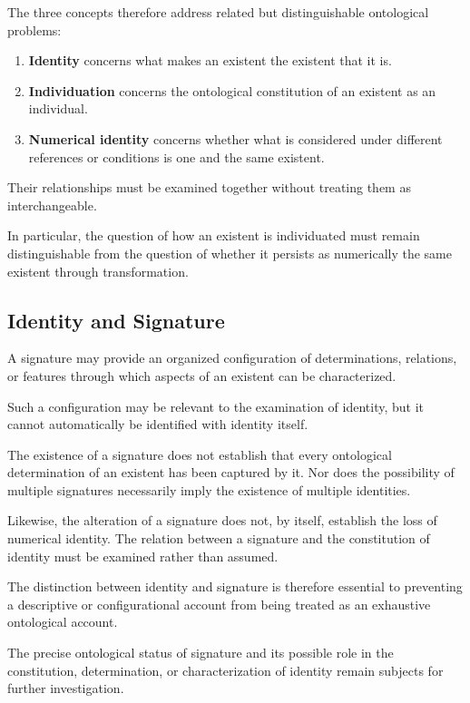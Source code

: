 The three concepts therefore address related but
distinguishable ontological problems:

\begin{enumerate}
    \item \textbf{Identity} concerns what makes an
    existent the existent that it is.

    \item \textbf{Individuation} concerns the
    ontological constitution of an existent as
    an individual.

    \item \textbf{Numerical identity} concerns whether
    what is considered under different references
    or conditions is one and the same existent.
\end{enumerate}

Their relationships must be examined together without
treating them as interchangeable.

In particular, the question of how an existent is
individuated must remain distinguishable from the
question of whether it persists as numerically the
same existent through transformation.

\subsection{Identity and Signature}

A signature may provide an organized configuration
of determinations, relations, or features through
which aspects of an existent can be characterized.

Such a configuration may be relevant to the examination
of identity, but it cannot automatically be identified
with identity itself.

The existence of a signature does not establish that
every ontological determination of an existent has
been captured by it. Nor does the possibility of
multiple signatures necessarily imply the existence
of multiple identities.

Likewise, the alteration of a signature does not,
by itself, establish the loss of numerical identity.
The relation between a signature and the constitution
of identity must be examined rather than assumed.

The distinction between identity and signature is
therefore essential to preventing a descriptive or
configurational account from being treated as an
exhaustive ontological account.

The precise ontological status of signature and its
possible role in the constitution, determination,
or characterization of identity remain subjects
for further investigation.

